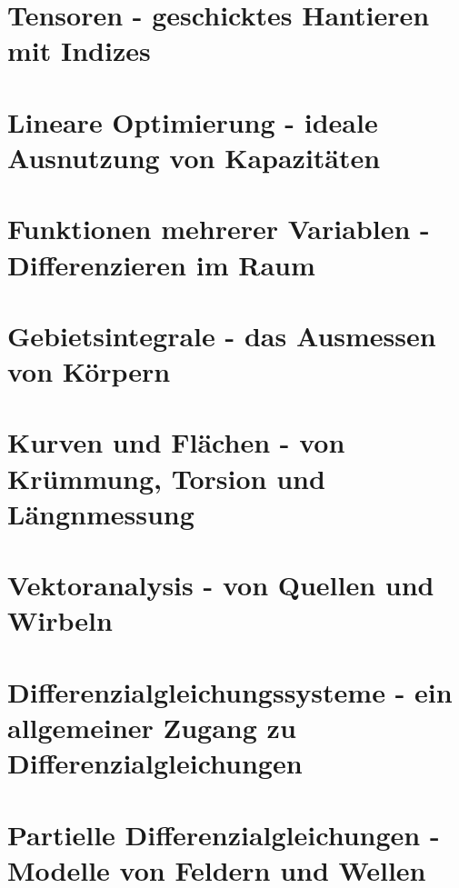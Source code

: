 \documentclass[a4paper]{article}
\begin{document}
\section{Tensoren - geschicktes Hantieren mit Indizes}

\section{Lineare Optimierung - ideale Ausnutzung von Kapazitäten}

\section{Funktionen mehrerer Variablen - Differenzieren im Raum}

\section{Gebietsintegrale - das Ausmessen von Körpern}

\section{Kurven und Flächen - von Krümmung, Torsion und Längnmessung}

\section{Vektoranalysis - von Quellen und Wirbeln}

\section{Differenzialgleichungssysteme - ein allgemeiner Zugang zu Differenzialgleichungen}

\section{Partielle Differenzialgleichungen - Modelle von Feldern und Wellen}
\end{document}
